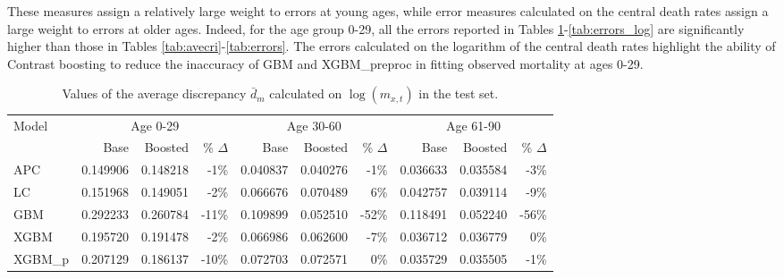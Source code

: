 \documentclass[a4,11pt]{article}
\begin{document}
These measures assign a relatively large weight to errors at young ages, while error measures calculated on the central death rates assign a large weight to errors at older ages.
Indeed, for the age group 0-29, all the errors reported in Tables \ref{tab:avecri_log}-\ref{tab:errors_log} are significantly higher than those in Tables \ref{tab:avecri}-\ref{tab:errors}. 
The errors calculated on the logarithm of the central death rates highlight the ability of Contrast boosting to reduce the inaccuracy of GBM and XGBM\_preproc in fitting observed mortality at ages 0-29.
%
\begin{table}[ht]
\centering
\scriptsize
\begin{tabular}{|l|r|r|r|r|r|r|r|r|r|}
\hline
\multirow{2}{*}{Model} & \multicolumn{3}{c|}{Age 0-29} & \multicolumn{3}{c|}{Age 30-60} & \multicolumn{3}{c|}{Age 61-90} \\
\cline{2-10}
			&	Base 	&	Boosted 	& \% $\Delta$ &	Base 	&	Boosted 	& \% $\Delta$ &	Base 	&	Boosted	& \% $\Delta$\\
\hline
APC 			&	0.149906	&	0.148218	&	-1\%		&	0.040837	&	0.040276		&	-1\%		&	0.036633	&	0.035584	&	-3\%	\\
LC 			&	0.151968	&	0.149051	&	-2\%		&	0.066676	&	0.070489		&	6\%		&	0.042757	&	0.039114	&	-9\%	\\
GBM 		&	0.292233	&	0.260784	&	-11\%	&	0.109899	&	0.052510		&	-52\%	&	0.118491	&	0.052240	&	-56\% \\
XGBM 		&	0.195720	&	0.191478	&	-2\%		&	0.066986	&	0.062600		&	-7\%		&	0.036712	&	0.036779	&	0\%	\\
XGBM\_p 	&	0.207129	&	0.186137	&	-10\%	&	0.072703	&	0.072571		&	0\%		&	0.035729	&	0.035505	&	-1\%	\\
\hline
\end{tabular}
\caption{Values of the average discrepancy $\bar{d}_m$ calculated on $\log{\left(m_{x,t}\right)}$ in the test set.}
\label{tab:avecri_log}
\end{table}\\
%
\end{document}
